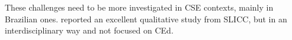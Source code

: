 These challenges need to be more investigated in \gls{CSE} contexts, mainly in Brazilian ones.  reported an excellent qualitative study from \gls{SLICC}, but in an interdisciplinary way and not focused on \gls{CEd}.


                

        

        
